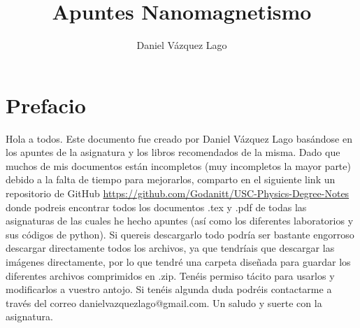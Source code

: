\documentclass[12pt,a4paper]{book}
\title{Apuntes Nanomagnetismo}
\author{Daniel Vázquez Lago}
\numberwithin{equation}{section}
\numberwithin{figure}{section}
\begin{document}
\maketitle


\newpage


\tableofcontents %

\newpage

\section*{Prefacio}

Hola a todos. Este documento fue creado por Daniel Vázquez Lago basándose en los apuntes de la asignatura y los libros recomendados de la misma. Dado que muchos de mis documentos están incompletos (muy incompletos la mayor parte) debido a la falta de tiempo para mejorarlos, comparto en el siguiente link un repositorio de GitHub \url{https://github.com/Godanitt/USC-Physics-Degree-Notes} donde podreis encontrar todos los documentos .tex y .pdf de todas las asignaturas de las cuales he hecho apuntes (así como los diferentes laboratorios y sus códigos de python). Si quereis descargarlo todo podría ser bastante engorroso descargar directamente todos los archivos, ya que tendríais que descargar las imágenes directamente, por lo que tendré una carpeta diseñada para guardar los diferentes archivos comprimidos en .zip. Tenéis permiso tácito para usarlos y modificarlos a vuestro antojo. Si tenéis algunda duda podréis contactarme a través del correo danielvazquezlago@gmail.com. Un saludo y suerte con la asignatura.

\newpage


\end{document}
